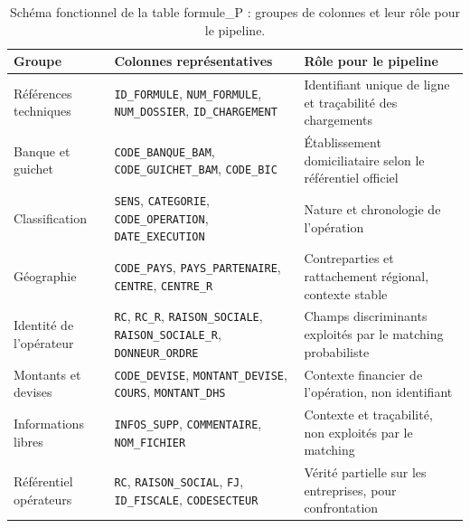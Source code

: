 \begin{table}[H]
\centering
\caption{Schéma fonctionnel de la table formule\_P : groupes de colonnes et leur rôle pour le pipeline.}
\renewcommand{\arraystretch}{1.3}
\setlength{\tabcolsep}{3pt}
{\small
\begin{tabular}{|p{3.0cm}|p{4.8cm}|p{6.2cm}|}
\hline
\textbf{Groupe} & \textbf{Colonnes représentatives} & \textbf{Rôle pour le pipeline} \\
\hline
Références techniques &
\texttt{ID\_FORMULE}, \texttt{NUM\_FORMULE}, \texttt{NUM\_DOSSIER}, \texttt{ID\_CHARGEMENT} &
Identifiant unique de ligne et traçabilité des chargements \\
\hline
Banque et guichet &
\texttt{CODE\_BANQUE\_BAM}, \texttt{CODE\_GUICHET\_BAM}, \texttt{CODE\_BIC} &
Établissement domiciliataire selon le référentiel officiel \\
\hline
Classification &
\texttt{SENS}, \texttt{CATEGORIE}, \texttt{CODE\_OPERATION}, \texttt{DATE\_EXECUTION} &
Nature et chronologie de l'opération \\
\hline
Géographie &
\texttt{CODE\_PAYS}, \texttt{PAYS\_PARTENAIRE}, \texttt{CENTRE}, \texttt{CENTRE\_R} &
Contreparties et rattachement régional, contexte stable \\
\hline
Identité de l'opérateur &
\texttt{RC}, \texttt{RC\_R}, \texttt{RAISON\_SOCIALE}, \texttt{RAISON\_SOCIALE\_R}, \texttt{DONNEUR\_ORDRE} &
Champs discriminants exploités par le matching probabiliste \\
\hline
Montants et devises &
\texttt{CODE\_DEVISE}, \texttt{MONTANT\_DEVISE}, \texttt{COURS}, \texttt{MONTANT\_DHS} &
Contexte financier de l'opération, non identifiant \\
\hline
Informations libres &
\texttt{INFOS\_SUPP}, \texttt{COMMENTAIRE}, \texttt{NOM\_FICHIER} &
Contexte et traçabilité, non exploités par le matching \\
\hline
Référentiel opérateurs &
\texttt{RC}, \texttt{RAISON\_SOCIAL}, \texttt{FJ}, \texttt{ID\_FISCALE}, \texttt{CODESECTEUR} &
Vérité partielle sur les entreprises, pour confrontation \\
\hline
\end{tabular}
}
\end{table}

